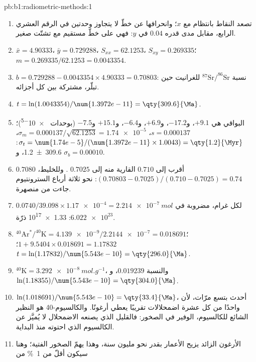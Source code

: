 \begin{solution}{pb:b1:radiometric-methods:1}
\begin{enumerate}
  \item تصعد النقاط بانتظام مع $x$؛ وانحرافها عن خطّ لا يتجاوز وحدتين في الرقم العشري الرابع، مقابل مدى قدره $0.04$ في $y$: فهي على خطّ مستقيم مع تشتّت صغير.
  \item $\bar x = 4.90333$، $\bar y = 0.729288$، $S_{xx} = 62.1253$، $S_{xy} =
        0.269335$؛ $m = 0.269335/62.1253 = 0.0043354$.
  \item $b = 0.729288 - 0.0043354 \times 4.90333 = 0.70803$: نسبة
        $^{87}\mathrm{Sr}/^{86}\mathrm{Sr}$ للغرانيت حين تبلّر، مشتركة بين كل أجزائه.
  \item $t = \ln(1.0043354)/\num{1.3972e-11} = \qty{309.6}{\Ma}$.
  \item البواقي هي $+9.1$، و$-17.2$، و$+6.9$، و$-6.4$، و$+15.1$ و$-7.5$ (بوحدات
        \num{e-5})؛ $s = 0.000137$، $\sigma_m = 0.000137/\sqrt{62.1253} =
        \num{1.74e-5}$، $\sigma_t = \num{1.74e-5}/(\num{1.3972e-11} \times 1.0043)
        = \qty{1.2}{\Myr}$: \qty[uncertainty-mode=separate]{309.6(12)}{\Ma}، و
        $\sigma_b = 0.00010$.
  \item $0.7080$ أقرب إلى $0.710$ القارية منه إلى $0.7025$ .
        وللخليط، $(0.70803 - 0.7025)/(0.710 - 0.7025) = 0.74$: نحو ثلاثة أرباع
        السترونتيوم جاءت من  منصهرة.
  \item $0.0740/39.098 \times \num{1.17e-4} = \qty{2.214e-7}{mol}$ لكل غرام،
        مضروبة في $\num{6.022e23}$: \num{1.33e17} ذرّة.
  \item $^{40}\mathrm{Ar}^*/^{40}\mathrm{K} = \num{4.139e-9}/\num{2.2144e-7} =
        0.018691$؛ $1 + 9.5404 \times 0.018691 = 1.17832$؛ $t =
        \ln(1.17832)/\num{5.543e-10} = \qty{296.0}{\Ma}$.
  \item $^{40}\mathrm{K} = \qty{3.292e-8}{mol.g^{-1}}$، والنسبة $0.019239$،
        و$\ln(1.18355)/\num{5.543e-10} = \qty{304.0}{\Ma}$.
  \item $\ln(1.018691)/\num{5.543e-10} = \qty{33.4}{\Ma}$، أحدث بتسع مرّات، لأن
        واحدًا من كل عشرة اضمحلالات تقريبًا يعطي أرغونًا. والكالسيوم-40 هو النظير الشائع
        للكالسيوم، الوفير في الصخور: فالقليل الذي يصنعه الاضمحلال لا يُميَّز عن الكالسيوم
        الذي احتوته  منذ البداية.
  \item الأرغون الزائد يزيح الأعمار بقدر نحو مليون سنة، وهذا يهمّ الصخور الفتية؛ وهنا سيكون أقلّ من \qty{1}{\percent} من

\end{enumerate}
\end{solution}
